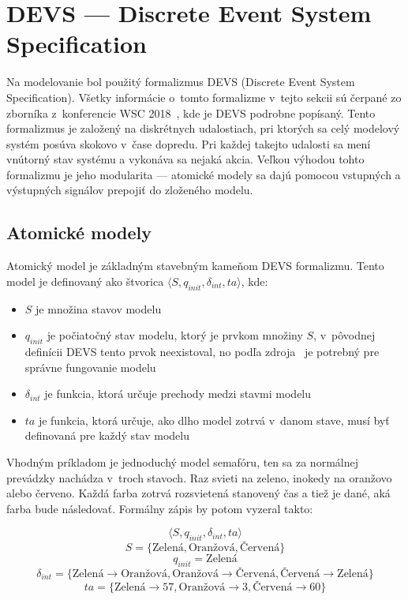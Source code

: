 \section{DEVS --- Discrete Event System Specification}
Na modelovanie bol použitý formalizmus DEVS (Discrete Event System Specification).
Všetky informácie o~tomto formalizme v~tejto sekcii sú čerpané zo zborníka z~konferencie WSC 2018~\cite{tendeloo2018discrete}, kde je DEVS podrobne popísaný.
Tento formalizmus je založený na diskrétnych udalostiach, pri ktorých sa celý modelový systém posúva skokovo v~čase dopredu.
Pri každej takejto udalosti sa mení vnútorný stav systému a vykonáva sa nejaká akcia.
Veľkou výhodou tohto formalizmu je jeho modularita --- atomické modely sa dajú pomocou vstupných a výstupných signálov prepojiť do zloženého modelu.

\subsection*{Atomické modely}
Atomický model je základným stavebným kameňom DEVS formalizmu.
Tento model je definovaný ako štvorica $\langle S, q_{init}, {\delta}_{int}, ta \rangle$, kde:
\begin{itemize}
  \item $S$ je množina stavov modelu
  \item $q_{init}$ je počiatočný stav modelu, ktorý je prvkom množiny $S$, v~pôvodnej definícii DEVS tento prvok neexistoval, no podľa zdroja~\cite{tendeloo2018discrete} je potrebný pre správne fungovanie modelu
  \item ${\delta}_{int}$ je funkcia, ktorá určuje prechody medzi stavmi modelu
  \item $ta$ je funkcia, ktorá určuje, ako dlho model zotrvá v~danom stave, musí byť definovaná pre každý stav modelu
\end{itemize}

Vhodným príkladom je jednoduchý model semafóru, ten sa za normálnej prevádzky nachádza v~troch stavoch.
Raz svieti na zeleno, inokedy na oranžovo alebo červeno.
Každá farba zotrvá rozsvietená stanovený čas a tiež je dané, aká farba bude následovať.
Formálny zápis by potom vyzeral takto:

\[\langle S, q_{init}, \delta_{int}, ta \rangle\]
\[S = \{\text{Zelená}, \text{Oranžová}, \text{Červená} \}\]
\[q_{init} = \text{Zelená}\]
\[\delta_{int} = \{ \text{Zelená} \rightarrow \text{Oranžová}, \text{Oranžová} \rightarrow \text{Červená}, \text{Červená} \rightarrow \text{Zelená} \}\]
\[ta = \{ \text{Zelená} \rightarrow 57, \text{Oranžová} \rightarrow 3, \text{Červená} \rightarrow 60 \}\]

